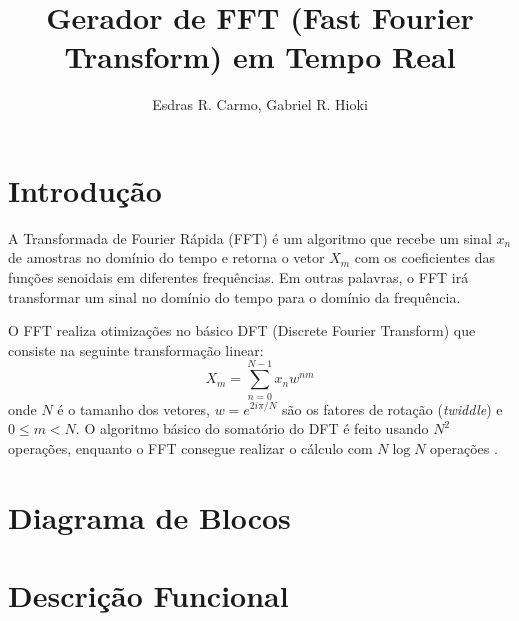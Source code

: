 \documentclass{article}
\newcommand{\tit}[1]{\textit{#1}}
\begin{document}
\title{Gerador de FFT (Fast Fourier Transform) em Tempo Real}
\author{Esdras R. Carmo, Gabriel R. Hioki}

\maketitle
\newpage
\tableofcontents
\newpage

\section{Introdução}
A Transformada de Fourier Rápida (FFT) é um algoritmo que recebe um sinal
$x_n$ de amostras no domínio do tempo e retorna o vetor $X_m$ com os coeficientes
das funções senoidais em diferentes frequências. Em outras palavras, o FFT irá 
transformar um sinal no domínio do tempo para o domínio da frequência.

O FFT realiza otimizações no básico DFT (Discrete Fourier Transform) que consiste na seguinte
transformação linear:
$$
    X_m = \sum_{n=0}^{N-1}x_n w^{nm}
$$
onde $N$ é o tamanho dos vetores, $w = e^{2i\pi/N}$ são os fatores de rotação (\tit{twiddle}) e
$0 \leq m < N$. O algoritmo básico do somatório do DFT é feito usando $N^2$ operações, enquanto
o FFT consegue realizar o cálculo com $N \log N$ operações \cite{fft-hardware}.

\section{Diagrama de Blocos}

\section{Descrição Funcional}

\newpage


\end{document}
